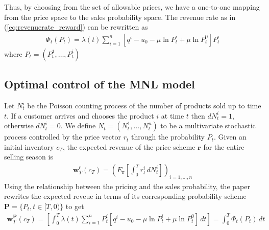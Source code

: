 Thus, by choosing from the set of allowable prices, we have a one-to-one mapping from the price space to the sales probability space. The revenue rate as in (\ref{eq:revenuerate_reward}) can be rewritten as 
\begin{align}
\Phi_t(P_t) = \lambda(t)\sum_{i=1}^{n}\left[q^i-u_0-\mu \ln P_t^i + \mu \ln P_t^0 \right]P_t^i\label{eq:revenuerate_prob}
\end{align}
where $P_t = (P_t^1,\ldots, P_t^i)$


\subsection{Optimal control of the MNL model}
Let $N_t^i$ be the Poisson counting process of the number of products sold up to time $t$. If a customer arrives and chooses the product $i$ at time $t$ then $dN_t^i = 1$, otherwise $dN_t^i=0$. We define $N_t = (N_t^1, \ldots, N_t^n)$ to be a multivariate stochastic process controlled by the price vector $r_t$ through the probability $P_t$. Given an initial inventory $c_T$, the expected revenue of the price scheme $\mathbf{r}$ 	for the entire selling season is 
\begin{align}
\mathbf{w}_T^{\mathbf{r}}(c_T) = \left(E_{\mathbf{r}}\left[\int_0^Tr^i_t\,dN^i_t\right]\right)_{i=1,\ldots,n}
\end{align}
Using the relationship between the pricing and the sales probability, the paper rewrites the expected reveue in terms of its corresponding probability scheme $\mathbf{P}=\{P_t, t \in [T,0)\}$ to get
\begin{align}
\mathbf{w}^{\mathbf{P}}_T(c_T) = \left[\int_{0}^{T}\lambda(t) \sum_{i=1}^{n}P_t^i[q^i-u_0-\mu \ln P_t^i + \mu \ln P_t^0]\,dt\right] = \int_{0}^{T}\Phi_t(P_t)\,dt
\end{align}

